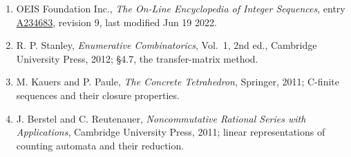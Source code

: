 \documentclass[11pt]{article}
\theoremstyle{definition}
\begin{document}
\begin{enumerate}

\item OEIS Foundation Inc., \emph{The On-Line Encyclopedia of Integer Sequences}, entry \href{https://oeis.org/A234683}{A234683}, revision 9, last modified Jun 19 2022.

\item R. P. Stanley, \emph{Enumerative Combinatorics}, Vol.~1, 2nd ed., Cambridge University Press, 2012; \S4.7, the transfer-matrix method.

\item M. Kauers and P. Paule, \emph{The Concrete Tetrahedron}, Springer, 2011; C-finite sequences and their closure properties.

\item J. Berstel and C. Reutenauer, \emph{Noncommutative Rational Series with Applications}, Cambridge University Press, 2011; linear representations of counting automata and their reduction.

\end{enumerate}
\end{document}
